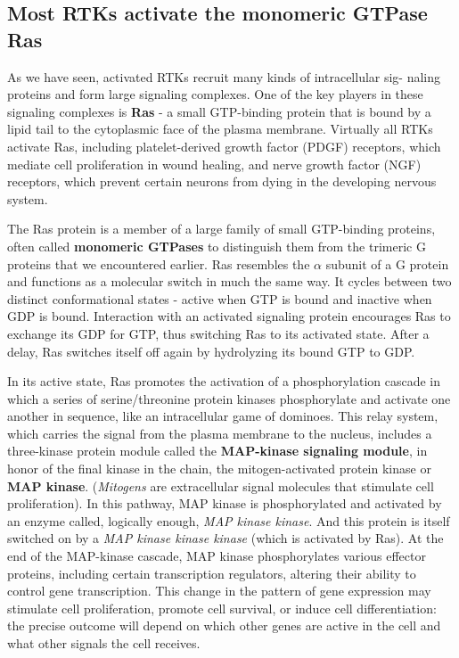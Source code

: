 \subsection{Most RTKs activate the monomeric GTPase Ras}

As we have seen, activated RTKs recruit many kinds of intracellular sig-
naling proteins and form large signaling complexes. One of the key players
in these signaling complexes is \textbf{Ras} - a small GTP-binding protein that is
bound by a lipid tail to the cytoplasmic face of the plasma membrane.
Virtually all RTKs activate Ras, including platelet-derived growth factor
(PDGF) receptors, which mediate cell proliferation in wound healing, and
nerve growth factor (NGF) receptors, which prevent certain neurons from
dying in the developing nervous system.

The Ras protein is a member of a large family of small GTP-binding
proteins, often called \textbf{monomeric GTPases} to distinguish them from
the trimeric G proteins that we encountered earlier. Ras resembles the
$\alpha$ subunit of a G protein and functions as a molecular switch in much
the same way. It cycles between two distinct conformational states - 
active when GTP is bound and inactive when GDP is bound.
Interaction with an activated signaling protein encourages Ras
to exchange its GDP for GTP, thus switching Ras to its activated state.
After a delay, Ras switches itself off again by hydrolyzing
its bound GTP to GDP.

In its active state, Ras promotes the activation of a phosphorylation cascade 
in which a series of serine/threonine protein kinases phosphorylate
and activate one another in sequence, like an intracellular game of dominoes. 
This relay system, which carries the signal from
the plasma membrane to the nucleus, includes a three-kinase protein
module called the \textbf{MAP-kinase signaling module}, in honor of the final
kinase in the chain, the mitogen-activated protein kinase or \textbf{MAP kinase}.
(\textit{Mitogens} are extracellular signal molecules that stimulate cell proliferation). 
In this pathway, MAP kinase is phosphorylated and activated by an
enzyme called, logically enough, \textit{MAP kinase kinase}. And this protein is
itself switched on by a \textit{MAP kinase kinase kinase} (which is activated by
Ras). At the end of the MAP-kinase cascade, MAP kinase phosphorylates
various effector proteins, including certain transcription regulators, altering 
their ability to control gene transcription. This change in the pattern
of gene expression may stimulate cell proliferation, promote cell survival,
or induce cell differentiation: the precise outcome will depend on which
other genes are active in the cell and what other signals the cell receives.

